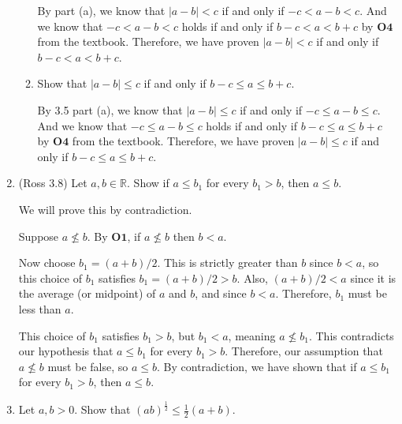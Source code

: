 \documentclass [10pt]{article}
\newcommand{\jg}[1]{{\color{blue} #1}}
\begin{document}
\begin{enumerate}
\begin{enumerate}
\jg{
By part (a), we know that $|a-b| < c$ if and only if $-c < a-b < c$. And we know that $-c < a-b < c$ holds if and only if $b - c < a < b+c$ by $\textbf{O4}$ from the textbook. Therefore, we have proven $|a-b|< c$ if and only if $b-c < a < b+c$.  \\
}

\item Show that $|a-b|\leq c$ if and only if $b-c \leq a \leq b+c.$

\jg{
By 3.5 part (a), we know that $|a-b| \leq c$ if and only if $-c \leq a-b \leq c$. And we know that $-c \leq a-b \leq c$ holds if and only if $b-c \leq a \leq b+c$ by $\textbf{O4}$ from the textbook. Therefore, we have proven $|a-b| \leq c$ if and only if $b-c \leq a \leq b+c$. \\
}

\end{enumerate}
\clearpage
\item (Ross 3.8) Let $a, b \in \mathbb{R}.$ Show if $a \leq b_1$ for every
$b_1>b$, then $a\leq b$.

\jg{
We will prove this by contradiction. 

Suppose $a \nleq b$. By $\textbf{O1}$, if $a \nleq b$ then $b < a$. 

Now choose $b_1 = (a+b)/2$. This is strictly greater than $b$ since $b < a$, so this choice of $b_1$ satisfies $b_1 = (a+b)/2 > b$. Also, $(a+b)/2 < a$ since it is the average (or midpoint) of $a$ and $b$, and since $b < a$. Therefore, $b_1$ must be less than $a$. 

This choice of $b_1$ satisfies $b_1 > b$, but $b_1 < a$, meaning $a \nleq b_1$. This contradicts our hypothesis that $a \leq b_1$ for every $b_1 > b$. Therefore, our assumption that $a \nleq b$ must be false, so $a \leq b$. By contradiction, we have shown that if $a \leq b_1$ for every $b_1 > b$, then $a \leq b$.
}

\clearpage
\item Let $a, b>0$. Show that $(ab)^{\frac{1}{2}} \leq \frac{1}{2}(a+b).$
\end{enumerate}
\end{document}
